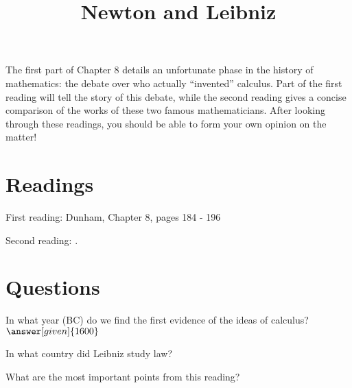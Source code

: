 \documentclass[nooutcomes]{ximera}
\title{Newton and Leibniz}
\begin{document}
\begin{abstract}
    
\end{abstract}
\maketitle

The first part of Chapter 8 details an unfortunate phase in the history of mathematics: the debate over who actually ``invented'' calculus.  Part of the first reading will tell the story of this debate, while the second reading gives a concise comparison of the works of these two famous mathematicians.  After looking through these readings, you should be able to form your own opinion on the matter!




\section{Readings}
First reading: Dunham, Chapter 8, pages 184 - 196

Second reading: .



\section{Questions}

\begin{question}
In what year (BC) do we find the first evidence of the ideas of calculus?
$\answer[given]{1600}$
\end{question}

\begin{question}
In what country did Leibniz study law?
\begin{multipleChoice}
\end{multipleChoice}
\end{question}


\begin{question}
What are the most important points from this reading?
\begin{freeResponse}
\end{freeResponse}

\end{question}
\end{document}
